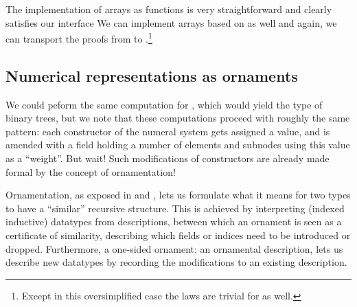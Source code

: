 The implementation of arrays as functions is very straightforward
and clearly satisfies our interface
We can implement arrays based on  as well
and again, we can transport the proofs from  to .\footnote{Except in this oversimplified case the laws are trivial for  as well.}


\subsection{Numerical representations as ornaments}\label{ssec:ornaments}
We could peform the same computation for \bL{}, which would yield the type of binary trees, but we note that these computations proceed with roughly the same pattern: each constructor of the numeral system gets assigned a value, and is amended with a field holding a number of elements and subnodes using this value as a ``weight''. But wait! Such modifications of constructors are already made formal by the concept of ornamentation!

Ornamentation, as exposed in \cite{algorn} and \cite{progorn}, lets us formulate what it means for two types to have a ``similar'' recursive structure. This is achieved by interpreting (indexed inductive) datatypes from descriptions, between which an ornament is seen as a certificate of similarity, describing which fields or indices need to be introduced or dropped. Furthermore, a one-sided ornament: an ornamental description, lets us describe new datatypes by recording the modifications to an existing description.

